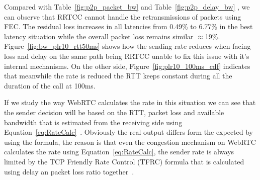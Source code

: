 Compared with Table~\ref{fig:p2p_packet_bw} and Table~\ref{fig:p2p_delay_bw} , we can observe that RRTCC cannot handle the retransmissions of packets using FEC. The residual loss increases in all latencies from 0.49\% to 6.77\% in the best latency situation while the overall packet loss remains similar $\approx$19\%. Figure~\ref{fig:bw_plr10_rtt50ms} shows how the sending rate reduces when facing loss and delay on the same path being RRTCC unable to fix this issue with it's internal mechanisms. On the other side, Figure~\ref{fig:plr10_100ms_cdf} indicates that meanwhile the rate is reduced the RTT keeps constant during all the duration of the call at 100ms.

If we study the way WebRTC calculates the rate in this situation we can see that the sender decision will be based on the RTT, packet loss and available bandwidth that is estimated from the receiving side using Equation~\ref{eq:RateCalc}~\cite{alvestrandCongestion2012}. Obviously the real output differs form the expected by using the formula, the reason is that even the congestion mechanism on WebRTC calculates the rate using Equation~\ref{eq:RateCalc}, the sender rate is always limited by the TCP Friendly Rate Control (TFRC) formula that is calculated using delay an packet loss ratio together~\cite{tfrc}.

